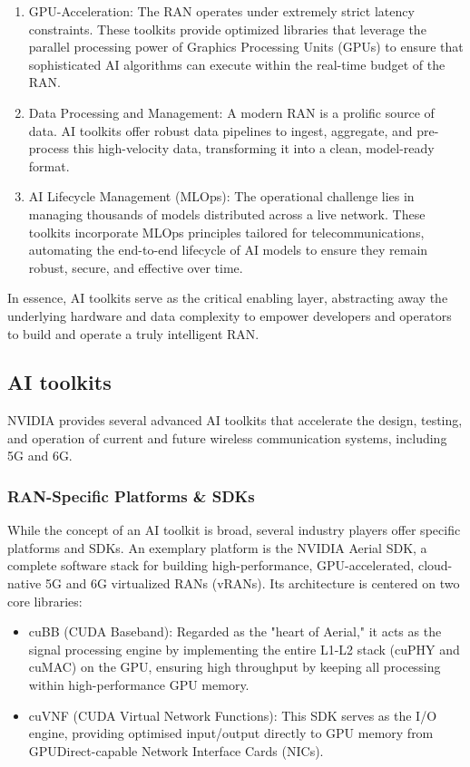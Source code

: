 \documentclass[conference]{IEEEtran}
\begin{document}
\begin{enumerate}
\item GPU-Acceleration: The RAN operates under extremely strict latency constraints. These toolkits provide optimized libraries that leverage the parallel processing power of Graphics Processing Units (GPUs) to ensure that sophisticated AI algorithms can execute within the real-time budget of the RAN.

\item Data Processing and Management: A modern RAN is a prolific source of data. AI toolkits offer robust data pipelines to ingest, aggregate, and pre-process this high-velocity data, transforming it into a clean, model-ready format.

\item AI Lifecycle Management (MLOps): The operational challenge lies in managing thousands of models distributed across a live network. These toolkits incorporate MLOps principles tailored for telecommunications, automating the end-to-end lifecycle of AI models to ensure they remain robust, secure, and effective over time.

\end{enumerate}

In essence, AI toolkits serve as the critical enabling layer, abstracting away the underlying hardware and data complexity to empower developers and operators to build and operate a truly intelligent RAN.

\subsection{AI toolkits}\label{AA}

NVIDIA provides several advanced AI toolkits that accelerate the design, testing, and operation of current and future wireless communication systems, including 5G and 6G.

\subsubsection{RAN-Specific Platforms \& SDKs}
While the concept of an AI toolkit is broad, several industry players offer specific platforms and SDKs. An exemplary platform is the NVIDIA Aerial SDK, a complete software stack for building high-performance, GPU-accelerated, cloud-native 5G and 6G virtualized RANs (vRANs). Its architecture is centered on two core libraries:

\begin{itemize}
\item cuBB (CUDA Baseband): Regarded as the "heart of Aerial," it acts as the signal processing engine by implementing the entire L1-L2 stack (cuPHY and cuMAC) on the GPU, ensuring high throughput by keeping all processing within high-performance GPU memory.

\item cuVNF (CUDA Virtual Network Functions): This SDK serves as the I/O engine, providing optimised input/output directly to GPU memory from GPUDirect-capable Network Interface Cards (NICs).
\end{itemize}
\end{document}
